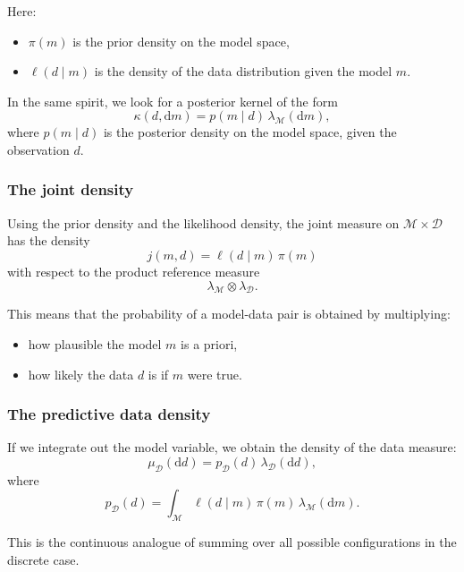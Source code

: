 \documentclass[11pt]{article}
\theoremstyle{remark}
\newcommand{\modelspace}{\mathcal{M}}
\newcommand{\dataspace}{\mathcal{D}}
\begin{document}
Here:
\begin{itemize}
    \item \(\pi(m)\) is the prior density on the model space,
    \item \(\ell(d\mid m)\) is the density of the data distribution given the model \(m\).
\end{itemize}

In the same spirit, we look for a posterior kernel of the form
\[
\kappa(d,\mathrm dm)
=
p(m\mid d)\,\lambda_{\modelspace}(\mathrm dm),
\]
where \(p(m\mid d)\) is the posterior density on the model space, given the observation \(d\).

\vspace{2mm}

\subsubsection{The joint density}

Using the prior density and the likelihood density, the joint measure on \(\modelspace \times \dataspace\) has the density
\[
j(m,d)
=
\ell(d\mid m)\,\pi(m)
\]
with respect to the product reference measure
\[
\lambda_{\modelspace}\otimes \lambda_{\dataspace}.
\]

This means that the probability of a model-data pair is obtained by multiplying:
\begin{itemize}
    \item how plausible the model \(m\) is a priori,
    \item how likely the data \(d\) is if \(m\) were true.
\end{itemize}

\vspace{2mm}

\subsubsection{The predictive data density}

If we integrate out the model variable, we obtain the density of the data measure:
\[
\mu_{\dataspace}(\mathrm dd)
=
p_{\dataspace}(d)\,\lambda_{\dataspace}(\mathrm dd),
\]
where
\[
p_{\dataspace}(d)
=
\int_{\modelspace} \ell(d\mid m)\,\pi(m)\,\lambda_{\modelspace}(\mathrm dm).
\]

This is the continuous analogue of summing over all possible configurations in the discrete case.

\vspace{2mm}
\end{document}
